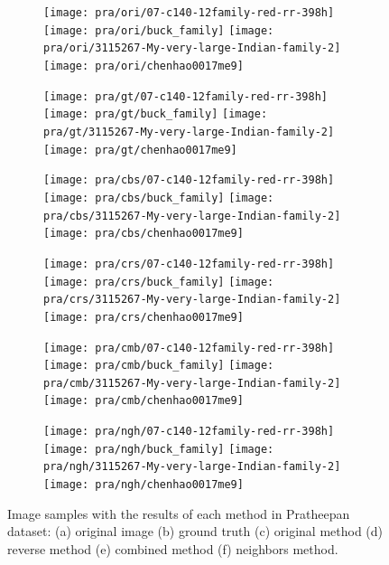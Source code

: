 \begin{figure}[!htb]
    \centering
    \begin{subfigure}[t]{0.15\textwidth}
        \texttt{[image: pra/ori/07-c140-12family-red-rr-398h]}
        \texttt{[image: pra/ori/buck\_family]}
        \texttt{[image: pra/ori/3115267-My-very-large-Indian-family-2]}
        \texttt{[image: pra/ori/chenhao0017me9]}
        \caption{}
    \end{subfigure}
    \begin{subfigure}[t]{0.15\textwidth}
        \texttt{[image: pra/gt/07-c140-12family-red-rr-398h]}
        \texttt{[image: pra/gt/buck\_family]}
        \texttt{[image: pra/gt/3115267-My-very-large-Indian-family-2]}
        \texttt{[image: pra/gt/chenhao0017me9]}
        \caption{}
    \end{subfigure}
    \begin{subfigure}[t]{0.15\textwidth}
        \texttt{[image: pra/cbs/07-c140-12family-red-rr-398h]}
        \texttt{[image: pra/cbs/buck\_family]}
        \texttt{[image: pra/cbs/3115267-My-very-large-Indian-family-2]}
        \texttt{[image: pra/cbs/chenhao0017me9]}
        \caption{}
    \end{subfigure}
    \begin{subfigure}[t]{0.15\textwidth}
        \texttt{[image: pra/crs/07-c140-12family-red-rr-398h]}
        \texttt{[image: pra/crs/buck\_family]}
        \texttt{[image: pra/crs/3115267-My-very-large-Indian-family-2]}
        \texttt{[image: pra/crs/chenhao0017me9]}
        \caption{}
    \end{subfigure}
    \begin{subfigure}[t]{0.15\textwidth}
        \texttt{[image: pra/cmb/07-c140-12family-red-rr-398h]}
        \texttt{[image: pra/cmb/buck\_family]}
        \texttt{[image: pra/cmb/3115267-My-very-large-Indian-family-2]}
        \texttt{[image: pra/cmb/chenhao0017me9]}
        \caption{}
    \end{subfigure}
    \begin{subfigure}[t]{0.15\textwidth}
        \texttt{[image: pra/ngh/07-c140-12family-red-rr-398h]}
        \texttt{[image: pra/ngh/buck\_family]}
        \texttt{[image: pra/ngh/3115267-My-very-large-Indian-family-2]}
        \texttt{[image: pra/ngh/chenhao0017me9]}
        \caption{}
    \end{subfigure}

    \caption[Image samples with the results of each method in Pratheepan dataset]{Image samples with the results of each method in Pratheepan dataset: (a) original image (b) ground truth (c) original method \cite{brancati:17} (d) reverse method (e) combined method (f) neighbors method.}
    \label{fig:results_pratheepan}
\end{figure}

